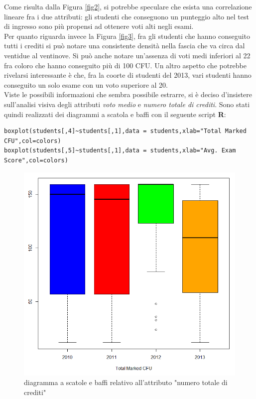             Come risulta dalla Figura \ref{fig2}, si potrebbe speculare che esista una correlazione lineare fra i due attributi: gli studenti che conseguono un punteggio alto nel test di ingresso sono più propensi ad ottenere voti alti negli esami. \\

            Per quanto riguarda invece la Figura \ref{fig3}, fra gli studenti che hanno conseguito tutti i crediti si può notare una consistente densità nella fascia che va circa dal ventidue al ventinove. Si può anche notare un'assenza di voti medi inferiori al 22 fra coloro che hanno conseguito più di 100 CFU. Un altro aspetto che potrebbe rivelarsi interessante è che, fra la coorte di studenti del 2013, vari studenti hanno conseguito un solo esame con un voto superiore al 20. \\

            Viste le possibili informazioni che sembra possibile estrarre, si è deciso d'insistere sull’analisi visiva degli attributi \textit{voto medio} e \textit{numero totale di crediti}. Sono stati quindi realizzati dei diagrammi a scatola e baffi con il seguente script \textbf{R}: 

            \begin{lstlisting}
boxplot(students[,4]~students[,1],data = students,xlab="Total Marked CFU",col=colors)
boxplot(students[,5]~students[,1],data = students,xlab="Avg. Exam Score",col=colors)
            \end{lstlisting}

            \begin{figure}
                \centering
                \caption{diagramma a scatole e baffi relativo all'attributo "numero totale di crediti"}
                \label{boxplot1}
            	\includegraphics[scale=0.55]{img/box_plot_1.png}
            \end{figure}


